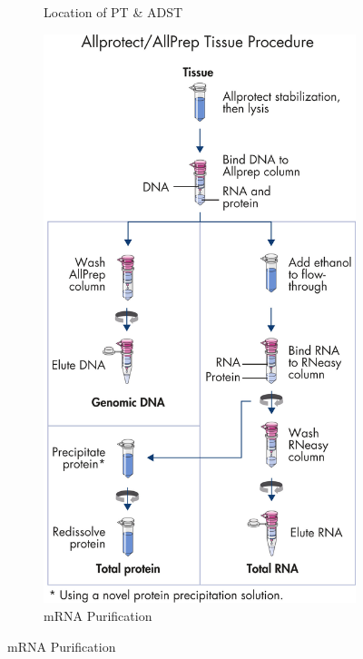 \documentclass[
11pt,notheorems,hyperref={pdfauthor=whatever}
]{beamer}
\begin{document}
\begin{frame}
\begin{figure}
\begin{subfigure}[b]{0.3\textwidth}
            \caption{Location of PT \& ADST \cite{taal2011brenner}}
            \label{fig: Location of PT and ADST}
        \end{subfigure}
        \begin{subfigure}[b]{0.3\textwidth}
            \centering
            \includegraphics[scale=0.08]{AldoFruc_RNAPurify.jpg}
            \caption{mRNA Purification}
            \label{fig: mRNA Purification}
        \end{subfigure}

\end{figure}
\end{frame}
\end{document}
